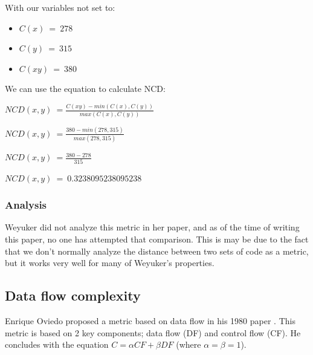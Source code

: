 \documentclass[]{article}
\begin{document}
With our variables not set to:

\begin{itemize}
	\item $C(x) ~= ~278$
	\item $C(y) ~= ~315$
	\item $C(xy) ~= ~380$
\end{itemize}

We can use the equation to calculate NCD:

$NCD(x,y) ~= \frac{C(xy) - min(C(x),C(y))}{max(C(x),C(y))}$

$NCD(x,y) ~= \frac{380 - min(278,315)}{max(278,315)}$

$NCD(x,y) ~= \frac{380 - 278}{315}$

$NCD(x,y) ~= ~0.3238095238095238$

\subsubsection{Analysis}

Weyuker did not analyze this metric in her paper, and as of the time of writing this paper, no one has attempted that comparison.
This is may be due to the fact that we don't normally analyze the distance between two sets of code as a metric, but it works very well for many of Weyuker's properties.



\subsection{Data flow complexity}

Enrique Oviedo proposed a metric based on data flow in his 1980 paper \cite{ref:oviedo1993control}.
This metric is based on 2 key components; data flow (DF) and control flow (CF).
He concludes with the equation $C = \alpha CF + \beta DF$ (where $\alpha=\beta=1$).

\end{document}
